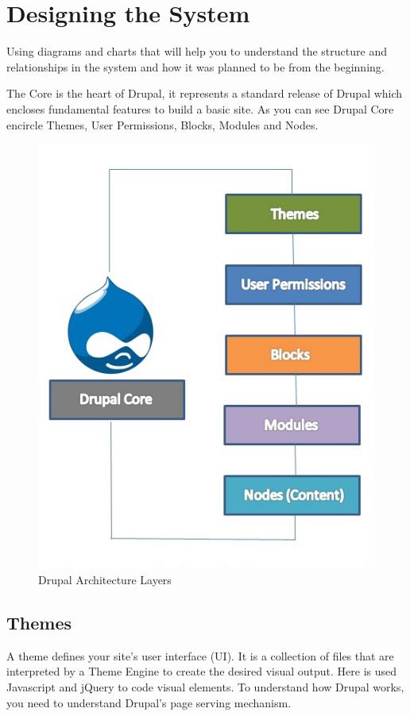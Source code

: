 \section{Designing the System}

Using diagrams and charts that will help you to understand the structure and relationships in the system and how it was planned to be from the beginning. 

The Core is the heart of Drupal, it represents a standard release of Drupal which encloses fundamental features to build a basic site. As you can see Drupal Core encircle Themes, User Permissions, Blocks, Modules and Nodes.

\begin{figure}[H]
\centering
\includegraphics[width=14cm]{Chapter2/drupal_architectural_layers.png}
\caption{Drupal Architecture Layers}
\label{fig:drupal_architectural_layers}
\end{figure}

\subsection{Themes}
A theme defines your site’s user interface (UI). It is a collection of files that are interpreted by a Theme Engine to create the desired visual output. Here is used Javascript and jQuery to code visual elements. To understand how Drupal works, you need to understand Drupal's page serving mechanism.

